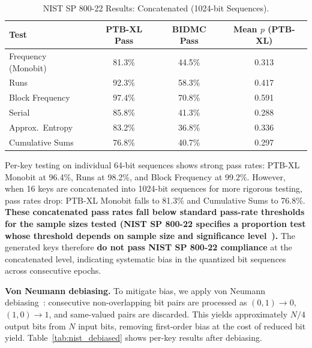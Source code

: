 \documentclass[sensors,article,submit,pdftex,moreauthors]{Definitions/mdpi}
\begin{document}
\begin{table}[H]
\caption{NIST SP 800-22 Results: Concatenated (1024-bit Sequences).\label{tab:nist_concat}}
\begin{tabularx}{\textwidth}{lCCC}
\toprule
\textbf{Test} & \textbf{PTB-XL Pass} & \textbf{BIDMC Pass} & \textbf{Mean $p$ (PTB-XL)} \\
\midrule
Frequency (Monobit) & 81.3\% & 44.5\% & 0.313 \\
Runs & 92.3\% & 58.3\% & 0.417 \\
Block Frequency & 97.4\% & 70.8\% & 0.591 \\
Serial & 85.8\% & 41.3\% & 0.288 \\
Approx.\ Entropy & 83.2\% & 36.8\% & 0.336 \\
Cumulative Sums & 76.8\% & 40.7\% & 0.297 \\
\bottomrule
\end{tabularx}
\end{table}

Per-key testing on individual 64-bit sequences shows strong pass rates: PTB-XL Monobit at 96.4\%, Runs at 98.2\%, and Block Frequency at 99.2\%. However, when 16 keys are concatenated into 1024-bit sequences for more rigorous testing, pass rates drop: PTB-XL Monobit falls to 81.3\% and Cumulative Sums to 76.8\%. \textbf{These concatenated pass rates fall below standard pass-rate thresholds for the sample sizes tested (NIST SP 800-22 specifies a proportion test whose threshold depends on sample size and significance level~\cite{bassham2010nist}).} The generated keys therefore \textbf{do not pass NIST SP 800-22 compliance} at the concatenated level, indicating systematic bias in the quantized bit sequences across consecutive epochs.

\textbf{Von Neumann debiasing.} To mitigate bias, we apply von Neumann debiasing~\cite{von1951various}: consecutive non-overlapping bit pairs are processed as $(0,1) \to 0$, $(1,0) \to 1$, and same-valued pairs are discarded. This yields approximately $N/4$ output bits from $N$ input bits, removing first-order bias at the cost of reduced bit yield. Table~\ref{tab:nist_debiased} shows per-key results after debiasing.
\end{document}
